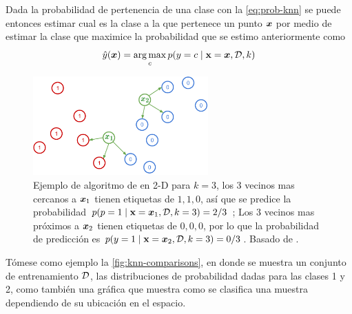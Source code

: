 Dada la probabilidad de pertenencia de una clase con la \cref{eq:prob-knn} se puede entonces estimar cual es la clase a la que pertenece un punto ${\bm{x}}$ por medio de estimar la clase que maximice la probabilidad que se estimo anteriormente como
\begin{equation}
  \hat{y}({\bm{x}}) = \operatorname*{arg\,max}_{c} p(y = c \mid {\mathbf{x}} = {\bm{x}}, \mathcal{D}, k)
\end{equation}

\begin{figure}[H]
  \centering
  \includegraphics[width=0.60\textwidth]{Figures/knn-example.pdf}
  \decoRule
  \caption[Ejemplo de algoritmo de \textsl{}]{Ejemplo de algoritmo de \textsl{} en 2-D para $k = 3$, los 3 vecinos mas cercanos a ${\bm{x}}_1$ tienen etiquetas de $1, 1, 0$, así que se predice la probabilidad $p(p = 1 \mid {\mathbf{x}} = {\bm{x}}_1, \mathcal{D}, k=3) = 2/3$ ; Los 3 vecinos mas próximos a ${\bm{x}}_2$ tienen etiquetas de $0, 0, 0$, por lo que la probabilidad de predicción es $p(y=1 \mid {\mathbf{x}} = {\bm{x}}_2, \mathcal{D}, k=3) = 0/3$. Basado de \cite{murphymachinel}.}
  \label{fig:knn-example}
\end{figure}

Tómese como ejemplo la \cref{fig:knn-comparisons}, en donde se muestra un conjunto de entrenamiento $\mathcal{D}$, las distribuciones de probabilidad dadas para las clases 1 y 2, como también una gráfica que muestra como se clasifica una muestra dependiendo de su ubicación en el espacio.

